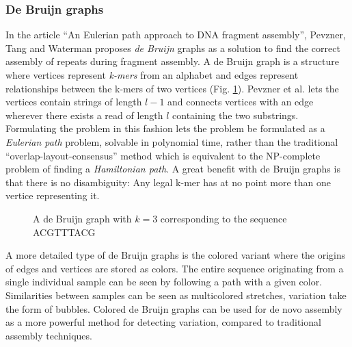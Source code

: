 \documentclass[thesis.tex]{subfiles}
\begin{document}
\subsubsection{De Bruijn graphs}
\label{sec:de_bruijn_graphs}
In the article ``An Eulerian path approach to DNA fragment assembly''\cite{an_eulerian_path_approach_to_dna_fragment_assembly}, Pevzner, Tang and Waterman proposes \textit{de Bruijn} graphs as a solution to find the correct assembly of repeats during fragment assembly. A de Bruijn graph is a structure where vertices represent \textit{k-mers} from an alphabet and edges represent relationships between the k-mers of two vertices (Fig. \ref{fig:de_bruijn_graph}). Pevzner et al. lets the vertices contain strings of length $l-1$ and connects vertices with an edge wherever there exists a read of length $l$ containing the two substrings. Formulating the problem in this fashion lets the problem be formulated as a \textit{Eulerian path} problem, solvable in polynomial time, rather than the traditional ``overlap-layout-consensus'' method which is equivalent to the NP-complete problem of finding a \textit{Hamiltonian path}\cite[Section 11.1]{algorithms_sequential_parallell_and_distributed}. A great benefit with de Bruijn graphs is that there is no disambiguity: Any legal k-mer has at no point more than one vertice representing it.\\
\begin{figure}[H]
  \begin{mdframed}
    \begin{center}
    \end{center}
  \end{mdframed}
  \caption{A de Bruijn graph with $k=3$ corresponding to the sequence ACGTTTACG}
  \label{fig:de_bruijn_graph}
\end{figure}
\par\noindent
A more detailed type of de Bruijn graphs is the colored variant where the origins of edges and vertices are stored as colors. The entire sequence originating from a single individual sample can be seen by following a path with a given color. Similarities between samples can be seen as multicolored stretches, variation take the form of bubbles. Colored de Bruijn graphs can be used for de novo assembly as a more powerful method for detecting variation, compared to traditional assembly techniques\cite{de_novo_assembly_and_genotyping_of_variants_using_colored_de_bruijn_graphs}.
\end{document}
